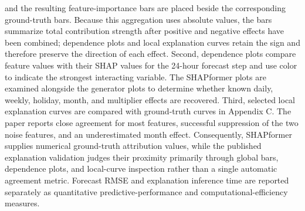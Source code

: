 and the resulting feature-importance bars are placed beside the corresponding
ground-truth bars. Because this aggregation uses absolute values, the bars
summarize total contribution strength after positive and negative effects have
been combined; dependence plots and local explanation curves retain the sign
and therefore preserve the direction of each effect. Second, dependence plots
compare feature values with their
SHAP values for the 24-hour forecast step and use color to indicate the
strongest interacting variable. The SHAPformer plots are examined alongside
the generator plots to determine whether known daily, weekly, holiday, month,
and multiplier effects are recovered. Third, selected local explanation curves
are compared with ground-truth curves in Appendix C. The paper reports close
agreement for most features, successful suppression of the two noise features,
and an underestimated month effect. Consequently, SHAPformer supplies
numerical ground-truth attribution values, while the published explanation
validation judges their proximity primarily through global bars, dependence
plots, and local-curve inspection rather than a single automatic agreement
metric. Forecast RMSE and explanation inference time are reported separately as
quantitative predictive-performance and computational-efficiency measures.

